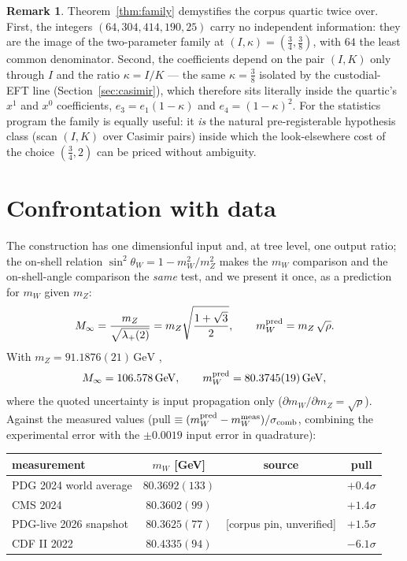 \documentclass[11pt,a4paper]{article}
\theoremstyle{definition}
\newtheorem{remark}{Remark}
\newcommand{\GeV}{\,\mathrm{GeV}}
\newcommand{\swsq}{\sin^2\theta_W}
\newcommand{\Minf}{M_\infty}
\begin{document}
\begin{remark}
\label{rem:family}
Theorem~\ref{thm:family} demystifies the corpus quartic twice over. First,
the integers $(64,304,414,190,25)$ carry no independent information: they
are the image of the two-parameter family at $(I,\kappa)=(\tfrac34,
\tfrac38)$, with $64$ the least common denominator. Second, the
coefficients depend on the pair $(I,K)$ only through $I$ and the ratio
$\kappa=I/K$ --- the same $\kappa=\tfrac38$ isolated by the custodial-EFT
line (Section~\ref{sec:casimir}), which therefore sits literally inside
the quartic's $x^1$ and $x^0$ coefficients, $e_3=e_1(1-\kappa)$ and
$e_4=(1-\kappa)^2$. For the statistics program the family is equally
useful: it \emph{is} the natural pre-registerable hypothesis class (scan
$(I,K)$ over Casimir pairs) inside which the look-elsewhere cost of the
choice $(\tfrac34,2)$ can be priced without ambiguity.
\end{remark}

\section{Confrontation with data}
\label{sec:data}

The construction has one dimensionful input and, at tree level, one output
ratio; the on-shell relation $\swsq=1-m_W^2/m_Z^2$ makes the $m_W$
comparison and the on-shell-angle comparison the \emph{same} test, and we
present it once, as a prediction for $m_W$ given $m_Z$:
\begin{equation}
\Minf=\frac{m_Z}{\sqrt{\lambda_+(2)}}=m_Z\sqrt{\frac{1+\sqrt3}{2}},
\qquad
m_W^{\rm pred}=m_Z\,\sqrt{\rho}.
\label{eq:anchor}
\end{equation}
With $m_Z=91.1876(21)\GeV$ \cite{pdg2024},
\begin{equation}
\Minf = 106.578\GeV,
\qquad
m_W^{\rm pred} = 80.3745(19)\GeV,
\label{eq:mwpred}
\end{equation}
where the quoted uncertainty is input propagation only
($\partial m_W/\partial m_Z=\sqrt\rho$). Against the measured values (pull
$\equiv(m_W^{\rm pred}-m_W^{\rm meas})/\sigma_{\rm comb}$, combining the
experimental error with the $\pm0.0019$ input error in quadrature):

\begin{center}
\begin{tabular}{lccc}
\toprule
measurement & $m_W$ [GeV] & source & pull \\
\midrule
PDG 2024 world average & $80.3692(133)$ & \cite{pdg2024} & $+0.4\sigma$\\
CMS 2024 & $80.3602(99)$ & \cite{cmsw2024} & $+1.4\sigma$\\
PDG-live 2026 snapshot & $80.3625(77)$ & [corpus pin, unverified] & $+1.5\sigma$\\
CDF II 2022 & $80.4335(94)$ & \cite{cdf2022} & $-6.1\sigma$\\
\bottomrule
\end{tabular}
\end{center}
\end{document}
